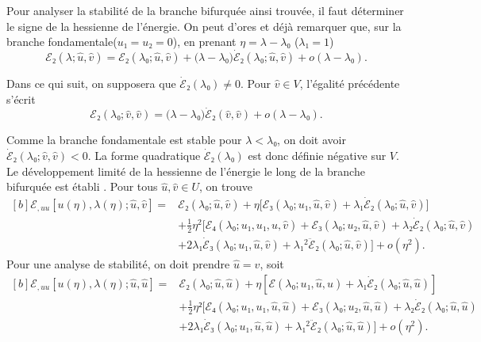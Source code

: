 \documentclass[12pt, final]{amsart}
\theoremstyle{definition}
\begin{document}
Pour analyser la stabilité de la branche bifurquée ainsi trouvée, il faut
déterminer le signe de la hessienne de l'énergie. On peut d'ores et déjà
remarquer que, sur la branche fondamentale(\(u₁ = u₂ = 0\)), en prenant
\(η = λ - λ₀\) (\(λ₁ = 1\))
\begin{equation}
 ℰ₂(λ; \hat{u}, \hat{v}) = ℰ₂(λ₀; \hat{u}, \hat{v}) + \bigl(λ - λ₀\bigr) \dot{ℰ}₂(λ₀; \hat{u}, \hat{v}) + o(λ - λ₀).
\end{equation}

Dans ce qui suit, on supposera que \(\dot{ℰ}₂(λ₀) ≠ 0\). Pour \(\hat{v}∈V\),
l'égalité précédente s'écrit
\begin{equation}
 ℰ₂(λ₀; \hat{v}, \hat{v}) = \bigl(λ - λ₀\bigr)\dot{ℰ}₂(\hat{v}, \hat{v}) + o(λ - λ₀).
\end{equation}

Comme la branche fondamentale est stable pour \(λ < λ₀\), on doit avoir
\(\dot{ℰ}₂(λ₀ ; \hat{v}, \hat{v}) < 0\). La forme quadratique \(\dot{ℰ}₂(λ₀)\)
est donc définie négative sur \(V\). Le développement limité de la hessienne de
l'énergie le long de la branche bifurquée est établi . Pour tous \(\hat{u}, \hat{v}∈U\), on trouve
\begin{equation}
  \label{eq:20220531054247}
  \begin{aligned}[b]
    ℰ_{, uu}[u(η), λ(η); \hat{u}, \hat{v}] ={}
    & ℰ₂(λ₀ ; \hat{u}, \hat{v}) + η \bigl[ℰ₃(λ₀ ; u₁, \hat{u}, \hat{v})  + λ₁ \dot{ℰ}₂(λ₀; \hat{u}, \hat{v})\bigr]\\
    & + \tfrac{1}{2} η^2 \bigl[ℰ₄(λ₀; u₁, u₁, \hat{u}, \hat{v}) + ℰ₃(λ₀; u₂, \hat{u}, \hat{v}) + λ₂ \dot{ℰ}₂(λ₀; \hat{u}, \hat{v})\\
    & + 2 λ₁ \dot{ℰ}₃(λ₀; u₁, \hat{u}, \hat{v}) + λ₁^2 \ddot{ℰ}₂(λ₀; \hat{u}, \hat{v}) \bigr] + o(η^2).
  \end{aligned}
\end{equation}
Pour une analyse de stabilité, on doit prendre \(\hat{u} = \hat{v}\), soit
\begin{equation}
  \begin{aligned}[b]
    \label{eq:20220531054218}
    ℰ_{, uu}[u(η), λ(η) ; \hat{u}, \hat{u}] ={}
    & ℰ₂(λ₀; \hat{u}, \hat{u}) + η [ℰ(λ₀; u₁, \hat{u}, \hat{u}) + λ₁ \dot{ℰ}₂ (λ₀; \hat{u}, \hat{u})]\\
    & + \tfrac{1}{2} η² [ℰ₄(λ₀; u₁, u₁, \hat{u}, \hat{u}) +ℰ₃(λ₀; u₂, \hat{u}, \hat{u}) + λ₂ \dot{ℰ}₂(λ₀; \hat{u}, \hat{u})\\
    & + 2 λ₁ \dot{ℰ}₃(λ₀; u₁, \hat{u}, \hat{u}) + λ₁^2 \ddot{ℰ}₂(λ₀; \hat{u}, \hat{u})] + o(η^2) .
  \end{aligned}
\end{equation}
\end{document}
